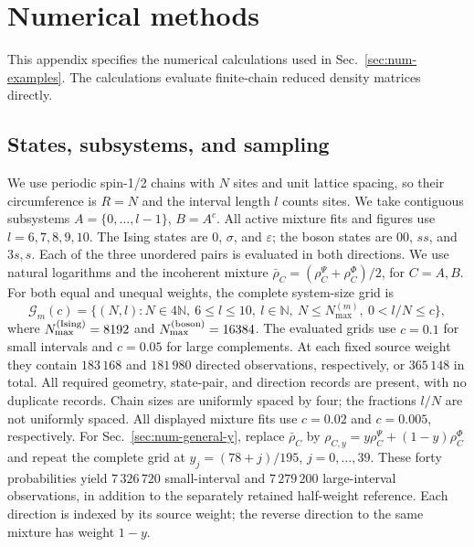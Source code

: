 \documentclass[11pt]{article}
\begin{document}

\section{Numerical methods}
\label{app:num-methods}
This appendix specifies the numerical calculations used in
Sec.~\ref{sec:num-examples}. The calculations evaluate finite-chain
reduced density matrices directly.

\subsection{States, subsystems, and sampling}
\label{app:num-sampling}
We use periodic spin-1/2 chains with $N$ sites and unit lattice spacing, so their
circumference is $R=N$ and the interval length $l$ counts sites. We take contiguous
subsystems $A=\{0,\ldots,l-1\}$, $B=A^c$. All active mixture
fits and figures use $l=6,7,8,9,10$. The Ising states are
$0$, $\sigma$, and $\varepsilon$; the boson states are
$00$, $ss$, and $3s,s$. Each of the three
unordered pairs is evaluated in both directions. We use natural
logarithms and the incoherent mixture
$\bar\rho_C=(\rho_C^\Psi+\rho_C^\Phi)/2$, for $C=A,B$.
For both equal and unequal weights, the complete system-size grid is
\begin{equation}
 \mathcal G_m(c)=\{(N,l):N\in4\mathbb N,\ 6\leq l\leq10,
 \ l\in\mathbb N,\ N\leq N_{\max}^{(m)},\ 0<l/N\leq c\},
 \label{eq:num-extended-grid}
\end{equation}
where $N_{\max}^{({\rm Ising})}=8192$ and
$N_{\max}^{({\rm boson})}=16384$. The evaluated grids use
$c=0.1$ for small intervals and $c=0.05$ for large complements.
At each fixed source weight they contain $183\,168$ and
$181\,980$ directed observations, respectively, or $365\,148$
in total. All required geometry,
state-pair, and direction records are present, with no duplicate
records. Chain sizes are uniformly spaced by four; the fractions
$l/N$ are not uniformly spaced. All displayed mixture fits use
$c=0.02$ and $c=0.005$, respectively. For
Sec.~\ref{sec:num-general-y}, replace $\bar\rho_C$ by
$\rho_{C,y}=y\rho_C^\Psi+(1-y)\rho_C^\Phi$ and repeat the complete
grid at $y_j=(78+j)/195$, $j=0,\ldots,39$. These forty probabilities
yield $7\,326\,720$ small-interval and $7\,279\,200$ large-interval
observations, in addition to the separately retained half-weight
reference. Each direction is indexed by its source weight; the
reverse direction to the same mixture has weight $1-y$.
\end{document}
